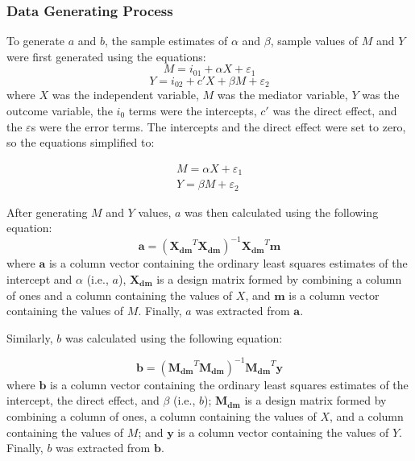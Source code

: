 \documentclass[10,a4paperpaper,]{article}
\begin{document}
\subsubsection{Data Generating Process}

To generate \(a\) and \(b\), the sample estimates of \(\alpha\) and
\(\beta\), sample values of \(M\) and \(Y\) were first generated using
the equations: \[M = i_{01} + \alpha X + \varepsilon_1\]
\[Y = i_{02} + c'X + \beta M + \varepsilon_2\] where \(X\) was the
independent variable, \(M\) was the mediator variable, \(Y\) was the
outcome variable, the \(i_0\) terms were the intercepts, \(c'\) was the
direct effect, and the \(\varepsilon\)s were the error terms. The
intercepts and the direct effect were set to zero, so the equations
simplified to:

\begin{gather} 
M = \alpha X + \varepsilon_1 \\
Y = \beta M + \varepsilon_2  
\end{gather}

After generating \(M\) and \(Y\) values, \(a\) was then calculated using
the following equation:
\[\mathbf{a} = (\mathbf{X_{dm}}^T \mathbf{X_{dm}})^{-1}\mathbf{X_{dm}}^T\mathbf{m}\]
where \(\mathbf{a}\) is a column vector containing the ordinary least
squares estimates of the intercept and \(\alpha\) (i.e., \(a\)),
\(\mathbf{X_{dm}}\) is a design matrix formed by combining a column of
ones and a column containing the values of \(X\), and \(\mathbf{m}\) is
a column vector containing the values of \(M\). Finally, \(a\) was
extracted from \(\mathbf{a}\).

Similarly, \(b\) was calculated using the following equation:

\[\mathbf{b} = (\mathbf{M_{dm}}^T \mathbf{M_{dm}})^{-1}\mathbf{M_{dm}}^T\mathbf{y}\]
where \(\mathbf{b}\) is a column vector containing the ordinary least
squares estimates of the intercept, the direct effect, and \(\beta\)
(i.e., \(b\)); \(\mathbf{M_{dm}}\) is a design matrix formed by
combining a column of ones, a column containing the values of \(X\), and
a column containing the values of \(M\); and \(\mathbf{y}\) is a column
vector containing the values of \(Y\). Finally, \(b\) was extracted from
\(\mathbf{b}\).
\end{document}
